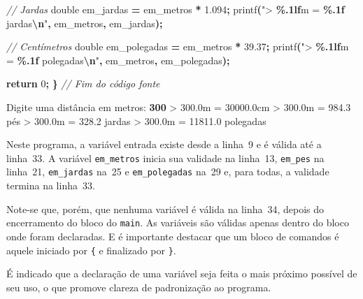 \documentclass[
  11pt,
  a4paper,
]{scrbook}
\newenvironment{Shaded}{\begin{snugshade}}{\end{snugshade}}
\newcommand{\CommentTok}[1]{\textcolor[rgb]{0.56,0.35,0.01}{\textit{#1}}}
\newcommand{\ControlFlowTok}[1]{\textcolor[rgb]{0.13,0.29,0.53}{\textbf{#1}}}
\newcommand{\DataTypeTok}[1]{\textcolor[rgb]{0.13,0.29,0.53}{#1}}
\newcommand{\DecValTok}[1]{\textcolor[rgb]{0.00,0.00,0.81}{#1}}
\newcommand{\FloatTok}[1]{\textcolor[rgb]{0.00,0.00,0.81}{#1}}
\newcommand{\KeywordTok}[1]{\textcolor[rgb]{0.13,0.29,0.53}{\textbf{#1}}}
\newcommand{\NormalTok}[1]{#1}
\newcommand{\OperatorTok}[1]{\textcolor[rgb]{0.81,0.36,0.00}{\textbf{#1}}}
\newcommand{\SpecialCharTok}[1]{\textcolor[rgb]{0.81,0.36,0.00}{\textbf{#1}}}
\newcommand{\StringTok}[1]{\textcolor[rgb]{0.31,0.60,0.02}{#1}}
\begin{document}
\begin{Shaded}
\begin{Highlighting}[numbers=left,,]
    \CommentTok{// Jardas}
    \DataTypeTok{double}\NormalTok{ em\_jardas }\OperatorTok{=}\NormalTok{ em\_metros }\OperatorTok{*} \FloatTok{1.094}\OperatorTok{;}
\NormalTok{    printf}\OperatorTok{(}\StringTok{"\textgreater{} }\SpecialCharTok{\%.1lf}\StringTok{m = }\SpecialCharTok{\%.1f}\StringTok{ jardas}\SpecialCharTok{\textbackslash{}n}\StringTok{"}\OperatorTok{,}\NormalTok{ em\_metros}\OperatorTok{,}\NormalTok{ em\_jardas}\OperatorTok{);}

    \CommentTok{// Centímetros}
    \DataTypeTok{double}\NormalTok{ em\_polegadas }\OperatorTok{=}\NormalTok{ em\_metros }\OperatorTok{*} \FloatTok{39.37}\OperatorTok{;}
\NormalTok{    printf}\OperatorTok{(}\StringTok{"\textgreater{} }\SpecialCharTok{\%.1lf}\StringTok{m = }\SpecialCharTok{\%.1f}\StringTok{ polegadas}\SpecialCharTok{\textbackslash{}n}\StringTok{"}\OperatorTok{,}\NormalTok{ em\_metros}\OperatorTok{,}\NormalTok{ em\_polegadas}\OperatorTok{);}

    \ControlFlowTok{return} \DecValTok{0}\OperatorTok{;}
\OperatorTok{\}}
\CommentTok{// Fim do código fonte}
\end{Highlighting}
\end{Shaded}

\begin{Shaded}
\begin{Highlighting}[]
\NormalTok{Digite uma distância em metros: }\KeywordTok{ 300 }
\NormalTok{\textgreater{} 300.0m = 30000.0cm}
\NormalTok{\textgreater{} 300.0m = 984.3 pés}
\NormalTok{\textgreater{} 300.0m = 328.2 jardas}
\NormalTok{\textgreater{} 300.0m = 11811.0 polegadas}
\end{Highlighting}
\end{Shaded}

Neste programa, a variável entrada existe desde a linha~9 e é válida até
a linha~33. A variável \texttt{em\_metros} inicia sua validade na
linha~13, \texttt{em\_pes} na linha~21, \texttt{em\_jardas} na~25 e
\texttt{em\_polegadas} na~29 e, para todas, a validade termina na
linha~33.

Note-se que, porém, que nenhuma variável é válida na linha~34, depois do
encerramento do bloco do \texttt{main}. As variáveis são válidas apenas
dentro do bloco onde foram declaradas. E é importante destacar que um
bloco de comandos é aquele iniciado por \texttt{\{} e finalizado por
\texttt{\}}.

\begin{tcolorbox}[enhanced jigsaw, arc=.35mm, bottomtitle=1mm, colbacktitle=quarto-callout-tip-color!10!white, title=\textcolor{quarto-callout-tip-color}{\faLightbulb}\hspace{0.5em}{Dica}, toprule=.15mm, left=2mm, opacityback=0, colback=white, colframe=quarto-callout-tip-color-frame, opacitybacktitle=0.6, bottomrule=.15mm, leftrule=.75mm, toptitle=1mm, coltitle=black, titlerule=0mm, rightrule=.15mm, breakable]

É indicado que a declaração de uma variável seja feita o mais próximo
possível de seu uso, o que promove clareza de padronização ao programa.

\end{tcolorbox}
\end{document}
